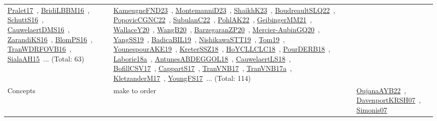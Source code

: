 {\begin{longtable}{lp{3cm}>{\raggedright\arraybackslash}p{6cm}>{\raggedright\arraybackslash}p{6cm}>{\raggedright\arraybackslash}p{8cm}}
\href{works/Pralet17.pdf}{Pralet17}~\cite{Pralet17}, \href{works/BridiLBBM16.pdf}{BridiLBBM16}~\cite{BridiLBBM16}, \href{works/SchuttS16.pdf}{SchuttS16}~\cite{SchuttS16}, \href{works/CauwelaertDMS16.pdf}{CauwelaertDMS16}~\cite{CauwelaertDMS16}, \href{works/ZarandiKS16.pdf}{ZarandiKS16}~\cite{ZarandiKS16}, \href{works/BlomPS16.pdf}{BlomPS16}~\cite{BlomPS16}, \href{works/TranWDRFOVB16.pdf}{TranWDRFOVB16}~\cite{TranWDRFOVB16}, \href{works/SialaAH15.pdf}{SialaAH15}~\cite{SialaAH15}... (Total: 63) & \href{works/KameugneFND23.pdf}{KameugneFND23}~\cite{KameugneFND23}, \href{works/MontemanniD23.pdf}{MontemanniD23}~\cite{MontemanniD23}, \href{works/ShaikhK23.pdf}{ShaikhK23}~\cite{ShaikhK23}, \href{works/BoudreaultSLQ22.pdf}{BoudreaultSLQ22}~\cite{BoudreaultSLQ22}, \href{works/PopovicCGNC22.pdf}{PopovicCGNC22}~\cite{PopovicCGNC22}, \href{works/SubulanC22.pdf}{SubulanC22}~\cite{SubulanC22}, \href{works/PohlAK22.pdf}{PohlAK22}~\cite{PohlAK22}, \href{works/GeibingerMM21.pdf}{GeibingerMM21}~\cite{GeibingerMM21}, \href{works/WallaceY20.pdf}{WallaceY20}~\cite{WallaceY20}, \href{works/WangB20.pdf}{WangB20}~\cite{WangB20}, \href{works/BarzegaranZP20.pdf}{BarzegaranZP20}~\cite{BarzegaranZP20}, \href{works/Mercier-AubinGQ20.pdf}{Mercier-AubinGQ20}~\cite{Mercier-AubinGQ20}, \href{works/YangSS19.pdf}{YangSS19}~\cite{YangSS19}, \href{works/BadicaBIL19.pdf}{BadicaBIL19}~\cite{BadicaBIL19}, \href{works/NishikawaSTT19.pdf}{NishikawaSTT19}~\cite{NishikawaSTT19}, \href{works/Tom19.pdf}{Tom19}~\cite{Tom19}, \href{works/YounespourAKE19.pdf}{YounespourAKE19}~\cite{YounespourAKE19}, \href{works/KreterSSZ18.pdf}{KreterSSZ18}~\cite{KreterSSZ18}, \href{works/HoYCLLCLC18.pdf}{HoYCLLCLC18}~\cite{HoYCLLCLC18}, \href{works/PourDERB18.pdf}{PourDERB18}~\cite{PourDERB18}, \href{works/Laborie18a.pdf}{Laborie18a}~\cite{Laborie18a}, \href{works/AntunesABDEGGOL18.pdf}{AntunesABDEGGOL18}~\cite{AntunesABDEGGOL18}, \href{works/CauwelaertLS18.pdf}{CauwelaertLS18}~\cite{CauwelaertLS18}, \href{works/BofillCSV17.pdf}{BofillCSV17}~\cite{BofillCSV17}, \href{works/CappartS17.pdf}{CappartS17}~\cite{CappartS17}, \href{works/TranVNB17.pdf}{TranVNB17}~\cite{TranVNB17}, \href{works/TranVNB17a.pdf}{TranVNB17a}~\cite{TranVNB17a}, \href{works/KletzanderM17.pdf}{KletzanderM17}~\cite{KletzanderM17}, \href{works/YoungFS17.pdf}{YoungFS17}~\cite{YoungFS17}... (Total: 114)\\
Concepts & make to order &  &  & \href{works/OujanaAYB22.pdf}{OujanaAYB22}~\cite{OujanaAYB22}, \href{works/DavenportKRSH07.pdf}{DavenportKRSH07}~\cite{DavenportKRSH07}, \href{works/Simonis07.pdf}{Simonis07}~\cite{Simonis07}\\

\end{longtable}}
